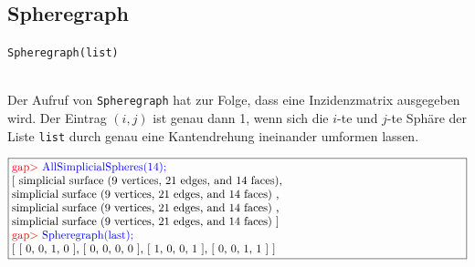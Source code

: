 \documentclass[12pt,titlepage,twoside,cleardoublepage]{article}
\theoremstyle{nummermitklammern}
\numberwithin{equation}{section}
\begin{document}
\subsection{Spheregraph}
\begin{large}
\texttt{Spheregraph(list)}
\end{large}\\
Der Aufruf von \texttt{Spheregraph} hat zur Folge, dass eine Inzidenzmatrix ausgegeben wird. Der Eintrag $(i,j)$ ist genau dann 1, wenn sich die $i$-te und $j$-te Sphäre der Liste \texttt{list} durch genau eine Kantendrehung ineinander umformen lassen. 
\begin{center}
$\fbox{\parbox{14cm}{
\textcolor{red}{gap$>$} \textcolor{blue}{AllSimplicialSpheres(14);}\newline
[ simplicial surface (9 vertices, 21 edges, and 14 faces),\newline
 simplicial surface (9 vertices, 21 edges, and 14 faces)
    ,\newline
     simplicial surface (9 vertices, 21 edges, and 14 faces)
    ,\newline
  simplicial surface (9 vertices, 21 edges, and 14 faces)
 ]\newline
\textcolor{red}{gap$>$} \textcolor{blue}{Spheregraph(last);}\newline
[ [ 0, 0, 1, 0 ], [ 0, 0, 0, 0 ], [ 1, 0, 0, 1 ], [ 0, 0, 1, 1 ] ]
}}$
\end{center}
\end{document}
